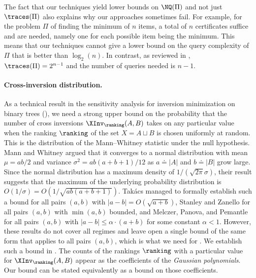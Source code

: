 The fact that our techniques yield lower bounds on $\NQ(\Pi)$ and not just $\traces(\Pi)$ also explains why our approaches sometimes fail. For example, for the problem $\Pi$ of finding the minimum of $n$ items, a total of $n$ certificates suffice and are needed, namely one for each possible item being the minimum. This means that our techniques cannot give a lower bound on the query complexity of $\Pi$ that is better than $\log_2(n)$. In contrast, as reviewed in , $\traces(\Pi)=2^{n-1}$ and the number of queries needed is $n-1$. 

\paragraph{Cross-inversion distribution.}
As a technical result in the sensitivity analysis for inversion minimization on binary trees (), we need a strong upper bound on the probability that the number of cross inversions $\XInv_\ranking(A,B)$ takes on any particular value when the ranking $\ranking$ of the set $X = A \sqcup B$ is chosen uniformly at random. This is the distribution of the Mann--Whitney statistic under the null hypothesis. Mann and Whitney \cite{MannWhitney1947} argued that it converges to a normal distribution with mean $\mu=ab/2$ and variance $\sigma^2=ab(a+b+1)/12$ as $a \doteq |A|$ and $b \doteq |B|$ grow large. Since the normal distribution has a maximum density of $1/(\sqrt{2\pi}\sigma)$, their result suggests that the maximum of the underlying probability distribution is $O(1/\sigma)=O(1/\sqrt{ab(a+b+1)})$. Tak\'acs \cite{Takacs1986} managed to formally establish such a bound for all pairs $(a,b)$ with $|a-b|=O(\sqrt{a+b})$, Stanley and Zanello \cite{SZ15} for all pairs $(a,b)$ with $\min(a,b)$ bounded, and Melczer, Panova, and Pemantle \cite{MPP20} for all pairs $(a,b)$ with $|a-b|\le \alpha\cdot(a+b)$ for some constant $\alpha<1$. However, these results do not cover all regimes and leave open a single bound of the same form that applies to all pairs $(a,b)$, which is what we need for . We establish such a bound in . The counts of the rankings $\ranking$ with a particular value for $\XInv_\ranking(A,B)$ appear as the coefficients of the \emph{Gaussian polynomials}.
Our bound can be stated equivalently as a bound on those coefficients.

